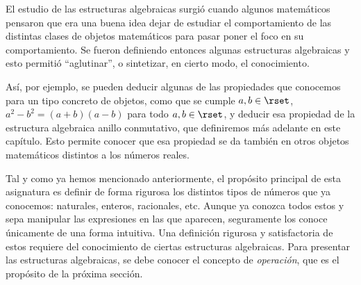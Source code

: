 


El estudio de las estructuras algebraicas surgió cuando algunos matemáticos
pensaron que era una buena idea dejar de estudiar el comportamiento de las
distintas clases de objetos matemáticos para pasar poner el foco en su
comportamiento. Se fueron definiendo entonces algunas estructuras
algebraicas y esto permitió ``aglutinar'', o sintetizar, en cierto modo, el
conocimiento.

Así, por ejemplo, se pueden deducir algunas de las propiedades que conocemos
para un tipo concreto de objetos, como que se cumple $a, b \in \rset$, $a^2
- b^2 = (a + b)(a - b)$ para todo $a, b \in \rset$, y deducir esa propiedad
de la estructura algebraica anillo conmutativo, que definiremos más adelante
en este capítulo. Esto permite conocer que esa propiedad se da también en
otros objetos matemáticos distintos a los números reales.

Tal y como ya hemos mencionado anteriormente, el propósito principal de esta
asignatura es definir de forma rigurosa los distintos tipos de números que
ya conocemos: naturales, enteros, racionales, etc. Aunque ya conozca todos
estos y sepa manipular las expresiones en las que aparecen, seguramente los
conoce únicamente de una forma intuitiva. Una definición rigurosa y
satisfactoria de estos requiere del conocimiento de ciertas estructuras
algebraicas. Para presentar las estructuras algebraicas, se debe conocer el
concepto de \emph{operación}, que es el propósito de la próxima sección.




